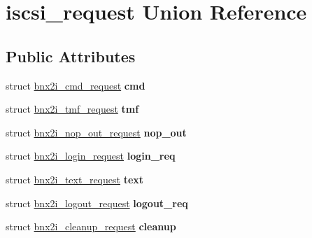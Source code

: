 \hypertarget{unioniscsi__request}{
\section{iscsi\_\-request Union Reference}
\label{unioniscsi__request}
}
\subsection*{Public Attributes}
\begin{DoxyCompactItemize}
\item 
\hypertarget{unioniscsi__request_abba129c4a130c04357e2da36e5d54082}{
struct \hyperlink{structbnx2i__cmd__request}{bnx2i\_\-cmd\_\-request} {\bfseries cmd}}
\label{unioniscsi__request_abba129c4a130c04357e2da36e5d54082}

\item 
\hypertarget{unioniscsi__request_a2ac80deb7bd3acd90486efc4c504e723}{
struct \hyperlink{structbnx2i__tmf__request}{bnx2i\_\-tmf\_\-request} {\bfseries tmf}}
\label{unioniscsi__request_a2ac80deb7bd3acd90486efc4c504e723}

\item 
\hypertarget{unioniscsi__request_af72685b11d412297776f1090c61371ca}{
struct \hyperlink{structbnx2i__nop__out__request}{bnx2i\_\-nop\_\-out\_\-request} {\bfseries nop\_\-out}}
\label{unioniscsi__request_af72685b11d412297776f1090c61371ca}

\item 
\hypertarget{unioniscsi__request_af80a4aa4387098e83892c9f3acbae9d2}{
struct \hyperlink{structbnx2i__login__request}{bnx2i\_\-login\_\-request} {\bfseries login\_\-req}}
\label{unioniscsi__request_af80a4aa4387098e83892c9f3acbae9d2}

\item 
\hypertarget{unioniscsi__request_af4f6898452774744dbc5bc847a4510c8}{
struct \hyperlink{structbnx2i__text__request}{bnx2i\_\-text\_\-request} {\bfseries text}}
\label{unioniscsi__request_af4f6898452774744dbc5bc847a4510c8}

\item 
\hypertarget{unioniscsi__request_a8e84968f84dcd76accb02b44d7fae7cb}{
struct \hyperlink{structbnx2i__logout__request}{bnx2i\_\-logout\_\-request} {\bfseries logout\_\-req}}
\label{unioniscsi__request_a8e84968f84dcd76accb02b44d7fae7cb}

\item 
\hypertarget{unioniscsi__request_aba07ad622ebe6f657842ae114415e16e}{
struct \hyperlink{structbnx2i__cleanup__request}{bnx2i\_\-cleanup\_\-request} {\bfseries cleanup}}
\label{unioniscsi__request_aba07ad622ebe6f657842ae114415e16e}

\end{DoxyCompactItemize}


